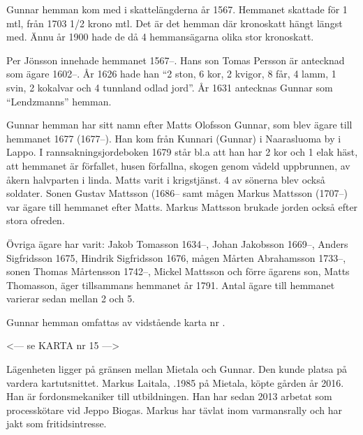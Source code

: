 %

Gunnar hemman kom med i skattelängderna år 1567. Hemmanet skattade för 1 mtl, från 1703  1/2 krono mtl. Det är det hemman där kronoskatt hängt längst med. Ännu år 1900 hade de då 4 hemmansägarna olika stor kronoskatt.

Per Jönsson innehade hemmanet 1567--. Hans son Tomas Persson är antecknad som ägare 1602--. År 1626 hade han ``2 ston, 6 kor, 2 kvigor, 8 får, 4 lamm, 1 svin, 2 kokalvar och 4 tunnland odlad jord''. År 1631 antecknas Gunnar som ``Lendzmanns'' hemman.

Gunnar hemman har sitt namn efter Matts Olofsson Gunnar, som blev ägare till hemmanet 1677 (1677--). Han kom från Kunnari (Gunnar) i Naarasluoma by i Lappo. I rannsakningsjordeboken 1679 står bl.a att han har 2 kor och 1 elak häst, att hemmanet är förfallet, husen förfallna, skogen genom vådeld uppbrunnen, av åkern halvparten i linda. Matts varit i krigstjänst. 4 av sönerna blev också soldater. Sonen Gustav Mattsson (1686-- samt mågen Markus Mattsson (1707--) var ägare till hemmanet efter Matts. Markus Mattsson brukade jorden också efter stora ofreden.

Övriga ägare har varit: Jakob Tomasson 1634--, Johan Jakobsson 1669--, Anders Sigfridsson 1675,  Hindrik Sigfridsson 1676,  mågen Mårten Abrahamsson 1733--, sonen Thomas Mårtensson 1742--, Mickel Mattsson och förre ägarens son, Matts Thomasson, äger tillsammans hemmanet år 1791. Antal ägare till hemmanet varierar sedan mellan 2 och 5.


Gunnar hemman omfattas av vidstående karta nr .


<--- se KARTA nr 15 --->


%


%



%
Lägenheten ligger på gränsen mellan Mietala och Gunnar. Den kunde platsa på vardera kartutsnittet. Markus Laitala, .1985 på Mietala, köpte gården år 2016. Han är fordonsmekaniker till utbildningen. Han har sedan 2013 arbetat som processkötare vid Jeppo Biogas. Markus har tävlat inom varmansrally och har jakt som fritidsintresse.\jhvspace{}



